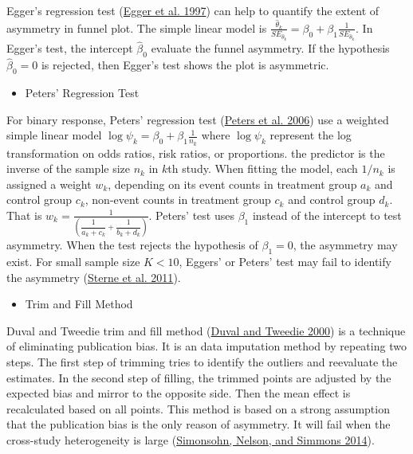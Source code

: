 \documentclass[
  11pt,
  openany]{memoir}
\providecommand{\tightlist}{%
  \setlength{\itemsep}{0pt}\setlength{\parskip}{0pt}}
\begin{document}
Egger's regression test (\protect\hyperlink{ref-eggerBiasMetaanalysisDetected1997}{Egger et al. 1997}) can help to quantify the extent of asymmetry in funnel plot.
The simple linear model is \(\frac{\hat\theta_k}{SE_{\hat\theta_k}} = \beta_0 + \beta_1 \frac{1}{SE_{\hat\theta_k}}\).
In Egger's test, the intercept \(\hat\beta_0\) evaluate the funnel asymmetry.
If the hypothesis \(\hat\beta_0=0\) is rejected, then Egger's test shows the plot is asymmetric.

\begin{itemize}
\tightlist
\item
  Peters' Regression Test
\end{itemize}

For binary response, Peters' regression test (\protect\hyperlink{ref-petersComparisonTwoMethods2006}{Peters et al. 2006}) use a weighted simple linear model \(\log\psi_k = \beta_0 + \beta_1\frac{1}{n_k}\)
where \(\log\psi_k\) represent the log transformation on odds ratios, risk ratios, or proportions.
the predictor is the inverse of the sample size \(n_k\) in \(k\)th study.
When fitting the model, each \(1/n_k\) is assigned a weight \(w_k\), depending on its event counts in treatment group \(a_k\) and control group \(c_k\), non-event counts in treatment group \(c_k\) and control group \(d_k\). That is \(w_k = \frac{1}{\left(\dfrac{1}{a_k+c_k}+\dfrac{1}{b_k+d_k}\right)}\).
Peters' test uses \(\beta_1\) instead of the intercept to test asymmetry.
When the test rejects the hypothesis of \(\beta_1 = 0\), the asymmetry may exist.
For small sample size \(K<10\), Eggers' or Peters' test may fail to identify the asymmetry (\protect\hyperlink{ref-sterneRecommendationsExaminingInterpreting2011}{Sterne et al. 2011}).

\begin{itemize}
\tightlist
\item
  Trim and Fill Method
\end{itemize}

Duval and Tweedie trim and fill method (\protect\hyperlink{ref-duvalTrimFillSimple2000}{Duval and Tweedie 2000}) is a technique of eliminating publication bias.
It is an data imputation method by repeating two steps.
The first step of trimming tries to identify the outliers and reevaluate the estimates.
In the second step of filling, the trimmed points are adjusted by the expected bias and mirror to the opposite side.
Then the mean effect is recalculated based on all points.
This method is based on a strong assumption that the publication bias is the only reason of asymmetry.
It will fail when the cross-study heterogeneity is large (\protect\hyperlink{ref-simonsohnPcurveKeyFiledrawer2014}{Simonsohn, Nelson, and Simmons 2014}).
\end{document}
